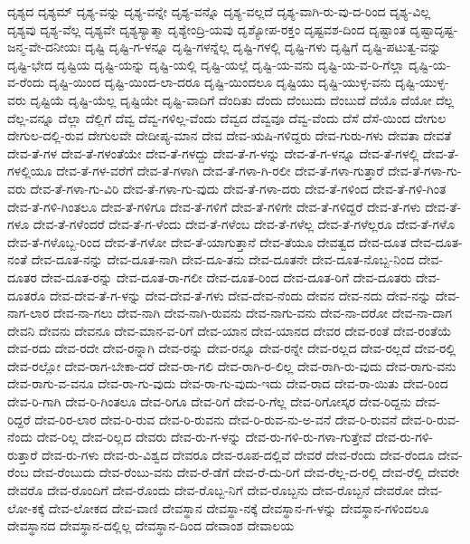 {ದೃಶ್ಯದ
ದೃಶ್ಯಮ್
ದೃಶ್ಯ-ವನ್ನು
ದೃಶ್ಯ-ವನ್ನೇ
ದೃಶ್ಯ-ವನ್ನೊ
ದೃಶ್ಯ-ವಲ್ಲದೆ
ದೃಶ್ಯ-ವಾಗಿ-ರು-ವು-ದ-ರಿಂದ
ದೃಶ್ಯ-ವಿಲ್ಲ
ದೃಶ್ಯವು
ದೃಶ್ಯ-ವೆಲ್ಲ
ದೃಶ್ಯವೇ
ದೃಶ್ಯಸ್ಯಾತ್ಮಾ
ದೃಶ್ಯೇಂದ್ರಿ-ಯವು
ದೃಶ್ಯೋಪ-ರಕ್ತಂ
ದೃಷ್ಟವಶ-ದಿಂದ
ದೃಷ್ಟಾಂತ
ದೃಷ್ಟಾದೃಷ್ಟ-ಜನ್ಮ-ವೇ-ದನೀಯಃ
ದೃಷ್ಟಿ
ದೃಷ್ಟಿ-ಗ-ಳನ್ನೂ
ದೃಷ್ಟಿ-ಗಳನ್ನೆಲ್ಲ
ದೃಷ್ಟಿ-ಗಳಲ್ಲಿ
ದೃಷ್ಟಿ-ಗಳು
ದೃಷ್ಟಿಗೆ
ದೃಷ್ಟಿ-ಪಟುತ್ವ-ವನ್ನು
ದೃಷ್ಟಿ-ಭೇದ
ದೃಷ್ಟಿಯ
ದೃಷ್ಟಿ-ಯನ್ನು
ದೃಷ್ಟಿ-ಯಲ್ಲಿ
ದೃಷ್ಟಿ-ಯಲ್ಲೆ
ದೃಷ್ಟಿ-ಯ-ವನು
ದೃಷ್ಟಿ-ಯ-ವ-ರಿ-ಗೆಲ್ಲಾ
ದೃಷ್ಟಿ-ಯ-ವ-ರೆಂದು
ದೃಷ್ಟಿ-ಯಿಂದ
ದೃಷ್ಟಿ-ಯಿಂದ-ಲಾ-ದರೂ
ದೃಷ್ಟಿ-ಯಿಂದಲೂ
ದೃಷ್ಟಿಯು
ದೃಷ್ಟಿ-ಯುಳ್ಳ-ವನು
ದೃಷ್ಟಿ-ಯುಳ್ಳ-ವರು
ದೃಷ್ಟಿಯೆ
ದೃಷ್ಟಿ-ಯೆಲ್ಲ
ದೃಷ್ಟಿಯೇ
ದೃಷ್ಟಿ-ವಾದಿಗೆ
ದೆಂದಿತು
ದೆಂದು
ದೆಂಬುದು
ದೆಂಬುದೆ
ದೆಯೊ
ದೆಯೋ
ದೆಲ್ಲ
ದೆಲ್ಲ-ವನ್ನೂ
ದೆಲ್ಲಾ
ದೆಲ್ಲಿಗೆ
ದೆವ್ವ
ದೆವ್ವ-ಗಳಿಲ್ಲ-ವೆಂದು
ದೆವ್ವದ
ದೆವ್ವವೂ
ದೆವ್ವ-ವೆಂದು
ದೆಸೆ
ದೆಸೆ-ಯಿಂದ
ದೇಗುಲ
ದೇಗುಲ-ದಲ್ಲಿ-ರುವ
ದೇಗುಲವೇ
ದೇದೀಪ್ಯ-ಮಾನ
ದೇವ
ದೇವ-ಋಷಿ-ಗಳಿದ್ದರು
ದೇವ-ಗುರು-ಗಳು
ದೇವತಾ
ದೇವತೆ
ದೇವ-ತೆ-ಗಳ
ದೇವ-ತೆ-ಗಳಂತೆಯೇ
ದೇವ-ತೆ-ಗಳದ್ದು
ದೇವ-ತೆ-ಗ-ಳನ್ನು
ದೇವ-ತೆ-ಗ-ಳನ್ನೂ
ದೇವ-ತೆ-ಗಳಲ್ಲಿ
ದೇವ-ತೆ-ಗಳಲ್ಲಿಯೂ
ದೇವ-ತೆ-ಗಳ-ವರೆಗೆ
ದೇವ-ತೆ-ಗಳಾಗಿ
ದೇವ-ತೆ-ಗಳಾ-ಗಿ-ರಲೀ
ದೇವ-ತೆ-ಗಳಾ-ಗುತ್ತಾರೆ
ದೇವ-ತೆ-ಗಳಾ-ಗು-ವರು
ದೇವ-ತೆ-ಗಳಾ-ಗು-ವಿರಿ
ದೇವ-ತೆ-ಗಳಾ-ಗು-ವುದು
ದೇವ-ತೆ-ಗಳಾ-ದರು
ದೇವ-ತೆ-ಗಳಿಂದ
ದೇವ-ತೆ-ಗಳಿ-ಗಿಂತ
ದೇವ-ತೆ-ಗಳಿ-ಗಿಂತಲೂ
ದೇವ-ತೆ-ಗಳಿಗೂ
ದೇವ-ತೆ-ಗಳಿಗೆ
ದೇವ-ತೆ-ಗಳಿಗೇ
ದೇವ-ತೆ-ಗಳಿದ್ದರೆ
ದೇವ-ತೆ-ಗಳು
ದೇವ-ತೆ-ಗಳೂ
ದೇವ-ತೆ-ಗಳೆಂದರೆ
ದೇವ-ತೆ-ಗ-ಳೆಂದು
ದೇವ-ತೆ-ಗಳೆಂಬ
ದೇವ-ತೆ-ಗಳೆಲ್ಲ
ದೇವ-ತೆ-ಗಳೆಲ್ಲರೂ
ದೇವ-ತೆ-ಗಳೊ
ದೇವ-ತೆ-ಗಳೊಬ್ಬ-ರಿಂದ
ದೇವ-ತೆ-ಗಳೋ
ದೇವ-ತೆ-ಯಾಗುತ್ತಾನೆ
ದೇವ-ತೆಯೂ
ದೇವತ್ವದ
ದೇವ-ದೂತ
ದೇವ-ದೂತ-ನಂತೆ
ದೇವ-ದೂತ-ನನ್ನು
ದೇವ-ದೂತ-ನಾಗಿ
ದೇವ-ದೂ-ತನು
ದೇವ-ದೂತನೇ
ದೇವ-ದೂತ-ನೊಬ್ಬ-ನಿಂದ
ದೇವ-ದೂತರ
ದೇವ-ದೂತ-ರನ್ನು
ದೇವ-ದೂತ-ರಾ-ಗಲೀ
ದೇವ-ದೂತ-ರಿಂದ
ದೇವ-ದೂತ-ರಿಗೆ
ದೇವ-ದೂತರು
ದೇವ-ದೂತರೊ
ದೇವ-ದೇವ-ತೆ-ಗ-ಳನ್ನು
ದೇವ-ದೇವ-ತೆ-ಗಳು
ದೇವ-ದೇವ-ನೆಂದು
ದೇವನ
ದೇವ-ನದು
ದೇವ-ನನ್ನು
ದೇವ-ನಾಗ-ಲಾರ
ದೇವ-ನಾ-ಗಲು
ದೇವ-ನಾಗಿ
ದೇವ-ನಾಗಿ-ರುವನು
ದೇವ-ನಾಗು-ವನು
ದೇವ-ನಾ-ದರೋ
ದೇವ-ನಾ-ದಾಗ
ದೇವನಿ
ದೇವನು
ದೇವನೂ
ದೇವ-ಮಾನ-ವ-ರಿಗೆ
ದೇವ-ಯಾನ
ದೇವ-ಯಾನದ
ದೇವರ
ದೇವ-ರಂತೆ
ದೇವ-ರಂತೆಯೆ
ದೇವ-ರದು
ದೇವ-ರದೇ
ದೇವ-ರನ್ನಾಗಿ
ದೇವ-ರನ್ನು
ದೇವ-ರನ್ನೂ
ದೇವ-ರನ್ನೇ
ದೇವ-ರಲ್ಲದ
ದೇವ-ರಲ್ಲದೆ
ದೇವ-ರಲ್ಲಿ
ದೇವ-ರಲ್ಲೋ
ದೇವ-ರಾಗ-ಬೇಕಾ-ದರೆ
ದೇವ-ರಾ-ಗಲಿ
ದೇವ-ರಾಗಿ-ರ-ಲಿಲ್ಲ
ದೇವ-ರಾಗಿ-ರು-ವುದು
ದೇವ-ರಾಗು-ವನು
ದೇವ-ರಾಗು-ವ-ವನೂ
ದೇವ-ರಾ-ಗು-ವುದು
ದೇವ-ರಾ-ಗು-ವುದು-ಇದು
ದೇವ-ರಾದ
ದೇವ-ರಾ-ಯಿತು
ದೇವ-ರಿಂದ
ದೇವ-ರಿ-ಗಾಗಿ
ದೇವ-ರಿ-ಗಿಂತಲೂ
ದೇವ-ರಿಗೂ
ದೇವ-ರಿಗೆ
ದೇವ-ರಿ-ಗೆಲ್ಲ
ದೇವ-ರಿಗೋಸ್ಕರ
ದೇವ-ರಿದ್ದನು
ದೇವ-ರಿದ್ದರೆ
ದೇವ-ರಿರ-ಲಾರ
ದೇವ-ರಿ-ರುವ
ದೇವ-ರಿ-ರುವನು
ದೇವ-ರಿ-ರುವ-ನು-ಅ-ವನೆ
ದೇವ-ರಿ-ರುವನೆ
ದೇವ-ರಿ-ರುವ-ನೆಂದು
ದೇವ-ರಿಲ್ಲ
ದೇವ-ರಿಲ್ಲದ
ದೇವರು
ದೇವ-ರು-ಗ-ಳನ್ನು
ದೇವ-ರು-ಗಳಿ-ರು-ಗಳಾ-ಗುತ್ತೇವೆ
ದೇವ-ರು-ಗಳಿ-ರುತ್ತಾರೆ
ದೇವ-ರು-ಗಳು
ದೇವ-ರು-ವಿಶ್ವದ
ದೇವರೂ
ದೇವ-ರೂಪ-ದಲ್ಲಿವೆ
ದೇವರೆ
ದೇವ-ರೆಂದು
ದೇವ-ರೆಂದೂ
ದೇವ-ರೆಂಬ
ದೇವ-ರೆಂಬುದು
ದೇವ-ರೆಂಬು-ವನು
ದೇವ-ರೆ-ಡೆಗೆ
ದೇವ-ರೆ-ದು-ರಿಗೆ
ದೇವ-ರೆಲ್ಲ-ದ-ರಲ್ಲಿ
ದೇವ-ರೆಲ್ಲಿ
ದೇವರೇ
ದೇವರೊ
ದೇವ-ರೊಂದಿಗೆ
ದೇವ-ರೊಂದು
ದೇವ-ರೊಬ್ಬ-ನಿಗೆ
ದೇವ-ರೊಬ್ಬನು
ದೇವ-ರೊಬ್ಬನೆ
ದೇವರೋ
ದೇವ-ಲೋ-ಕಕ್ಕೆ
ದೇವ-ಲೋಕದ
ದೇವ-ವಾಣಿ
ದೇವಸ್ಥಾನ
ದೇವಸ್ಥಾ-ನಕ್ಕೆ
ದೇವಸ್ಥಾನ-ಗ-ಳನ್ನು
ದೇವಸ್ಥಾನ-ಗಳಿಂದಲೂ
ದೇವಸ್ಥಾನದ
ದೇವಸ್ಥಾನ-ದಲ್ಲಿಲ್ಲ
ದೇವಸ್ಥಾನ-ದಿಂದ
ದೇವಾಂಶ
ದೇವಾಲಯ
}

